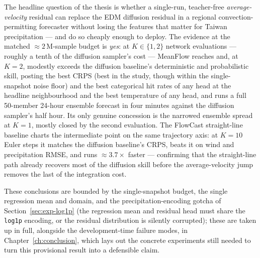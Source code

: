The headline question of the thesis is whether a single-run, teacher-free \emph{average-velocity} residual can replace the EDM diffusion residual in a regional convection-permitting forecaster without losing the features that matter for Taiwan precipitation --- and do so cheaply enough to deploy. The evidence at the matched $\approx 2\,\text{M}$-sample budget is \emph{yes}: at $K \in \{1, 2\}$ network evaluations --- roughly a tenth of the diffusion sampler's cost --- MeanFlow reaches and, at $K = 2$, modestly exceeds the diffusion baseline's deterministic and probabilistic skill, posting the best CRPS (best in the study, though within the single-snapshot noise floor) and the best categorical hit rates of any head at the headline neighbourhood and the best temperature of any head, and runs a full 50-member 24-hour ensemble forecast in four minutes against the diffusion sampler's half hour. Its only genuine concession is the narrowed ensemble spread at $K = 1$, mostly closed by the second evaluation. The FlowCast straight-line baseline charts the intermediate point on the same trajectory axis: at $K = 10$ Euler steps it matches the diffusion baseline's CRPS, beats it on wind and precipitation RMSE, and runs $\approx 3.7\times$ faster --- confirming that the straight-line path already recovers most of the diffusion skill before the average-velocity jump removes the last of the integration cost.

These conclusions are bounded by the single-snapshot budget, the single regression mean and domain, and the precipitation-encoding gotcha of Section~\ref{sec:exp-log1p} (the regression mean and residual head must share the \texttt{log1p} encoding, or the residual distribution is silently corrupted); these are taken up in full, alongside the development-time failure modes, in Chapter~\ref{ch:conclusion}, which lays out the concrete experiments still needed to turn this provisional result into a defensible claim.
